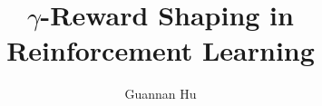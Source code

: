 \documentclass[12pt,a4paper]{article}
\begin{document}
\title{$\gamma$-Reward Shaping in Reinforcement Learning}
\author{Guannan Hu}
\maketitle








%


\end{document}
